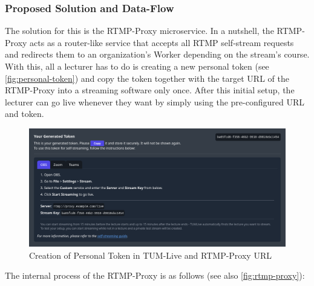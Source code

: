 \subsubsection{Proposed Solution and Data-Flow}

The solution for this is the RTMP-Proxy microservice. In a nutshell, the RTMP-Proxy acts as a router-like service that accepts all \ac{RTMP} self-stream requests and redirects them to an organization's Worker depending on the stream's course. With this, all a lecturer has to do is creating a new personal token (see \autoref{fig:personal-token}) and copy the token together with the target URL of the RTMP-Proxy into a streaming software only once.
After this initial setup, the lecturer can go live whenever they want by simply using the pre-configured URL and token.

\begin{figure}[htpb]
    \centering
    \includegraphics[width=\textwidth]{images/PersonalToken.png}
    \caption[Creation of Personal Token in TUM-Live and RTMP-Proxy URL]{Creation of Personal Token in TUM-Live and RTMP-Proxy URL}\label{fig:personal-token}
\end{figure}


The internal process of the RTMP-Proxy is as follows (see also \autoref{fig:rtmp-proxy}): 

